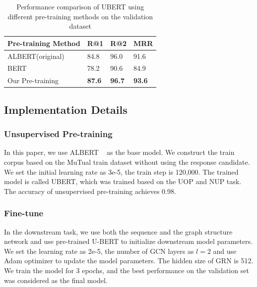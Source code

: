 \documentclass[letterpaper]{article}
\begin{document}
\begin{table}[t]
\centering
\begin{adjustbox}{width=1.92\columnwidth}
\begin{tabular}{l|l|l|l}
\hline
   Pre-training Method & R@1 & R@2 & MRR \\  \hline
   ALBERT(original) & 84.8 & 96.0 & 91.6  \\
   BERT ~\cite{devlin2018bert} & 78.2 & 90.6 & 84.9  \\
   Our Pre-training  & \textbf{87.6} & \textbf{96.7} & \textbf{93.6}  \\  \hline

\end{tabular}
\end{adjustbox}
\caption{Performance comparison of UBERT using different pre-training methods on the validation dataset}
\label{pre-training_result}
\end{table}

\subsection{Implementation Details}
\subsubsection{Unsupervised Pre-training} In this paper, we use ALBERT ~\cite{Lan2020} as the base model. We construct the train corpus based on the MuTual train dataset without using the response candidate. We set
the initial learning rate as 3e-5, the train step is 120,000. The trained model is called UBERT, which was trained based on the UOP and NUP task. The accuracy of unsupervised pre-training achieves 0.98.
\subsubsection{Fine-tune}
In the downstream task, we use both the sequence and the graph structure network and use pre-trained U-BERT to initialize downstream model parameters. We set the learning rate as 2e-5, the number of GCN layers as $l=2$ and use Adam optimizer to update the model parameters. The hidden size of GRN is 512. We train the model for 3 epochs, and the best performance on the validation set was considered as the final model.
\end{document}
